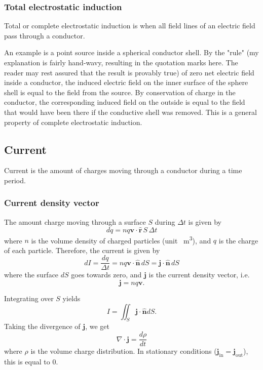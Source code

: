 \documentclass[a4paper, 12pt]{article}
\renewcommand{\vec}[1]{\bm{#1}}
\renewcommand{\j}{\ensuremath{\vec{j}}}
\let\tmp\hat
\renewcommand{\hat}[1]{\vec{\tmp{#1}}}
\begin{document}
    \subsubsection{Total electrostatic induction}
        Total or complete electrostatic induction is when all field lines of an electric field pass through a conductor.
        
        An example is a point source inside a spherical conductor shell. 
        By the "rule" (my explanation is fairly hand-wavy, resulting in the quotation marks here. 
        The reader may rest assured that the result is provably true) of zero net electric field inside a conductor, 
        the induced electric field on the inner surface of the sphere shell is equal to the field from the source. 
        By conservation of charge in the conductor, 
        the corresponding induced field on the outside is equal to the field that would have been there if the conductive shell was removed. 
        This is a general property of complete electrostatic induction. 
  
\subsection{Current}
    Current is the amount of charges moving through a conductor during a time period. 
    \subsubsection{Current density vector}
        The amount charge moving through a surface $S$ during $\Delta t$ is given by
        \begin{equation}
            dq = nq\vec{v}\cdot \hat{r}\,S \,\Delta t
        \end{equation}
        where $n$ is the volume density of charged particles (unit \si{\per\metre\cubed}), and $q$ is the charge of each particle.
        Therefore, the current is given by
        \begin{equation}
            dI = \frac{dq}{\Delta t} = nq\vec{v}\cdot\hat{n}\, dS = \j\cdot\hat{n}\, dS
        \end{equation}
        where the surface $dS$ goes towards zero, and $\j$ is the current density vector, i.e.
        \begin{equation}
            \j = nq\vec{v}.
        \end{equation}
        
        Integrating over $S$ yields
        \begin{equation}
            I = \iint_S \j\cdot\hat{n}dS.
        \end{equation}
        Taking the divergence of $\j$, we get
        \begin{equation}
            \nabla \cdot \j = \frac{d\rho}{dt}
        \end{equation}
        where $\rho$ is the volume charge distribution.
        In stationary conditions ($\j_{\text{in}} = \j_{\text{out}}$), this is equal to 0. 
    
\end{document}
